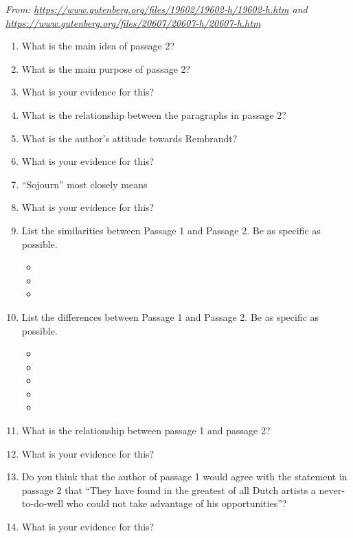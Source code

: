 \bigskip
\textit{From: \url{https://www.gutenberg.org/files/19602/19602-h/19602-h.htm} and \url{https://www.gutenberg.org/files/20607/20607-h/20607-h.htm}}

\begin{enumerate}

\item What is the main idea of passage 2? \hrulefill

\item What is the main purpose of passage 2? \hrulefill

\item What is your evidence for this? \hrulefill

\item What is the relationship between the paragraphs in passage 2? \hrulefill

\item What is the author's attitude towards Rembrandt? \hrulefill

\item What is your evidence for this? \hrulefill

\item ``Sojourn'' most closely means \hrulefill

\item What is your evidence for this? \hrulefill

\item List the similarities between Passage 1 and Passage 2. Be as specific as possible.
\begin{itemize}
\item
\item
\item
\end{itemize} 
 
\item List the differences between Passage 1 and Passage 2. Be as specific as possible.

\begin{itemize}
\item
\item
\item
\item
\item
\end{itemize} 

\item What is the relationship between passage 1 and passage 2? \hrulefill

\item What is your evidence for this? \hrulefill

\item Do you think that the author of passage 1 would agree with the statement in passage 2 that ``They have found in the greatest of all Dutch artists a never-to-do-well who could not take advantage of his opportunities''?

\hrulefill

\item What is your evidence for this? \hrulefill

\end{enumerate}

